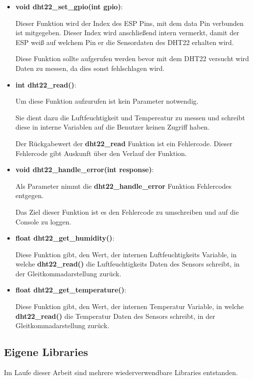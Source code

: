 \begin{itemize}
    \item \textbf{void dht22\_set\_gpio(int gpio)}:

    Dieser Funktion wird der Index des ESP Pins, mit dem data Pin verbunden ist mitgegeben. Dieser Index wird anschließend intern vermerkt, damit der ESP weiß auf welchem Pin er die Sensordaten des DHT22 erhalten wird.
    
    Diese Funktion sollte aufgerufen werden bevor mit dem DHT22 versucht wird Daten zu messen, da dies sonst fehlschlagen wird.
    \item \textbf{int dht22\_read()}:

    Um diese Funktion aufzurufen ist kein Parameter notwendig.

    Sie dient dazu die Luftfeuchtigkeit und Tempereatur zu messen und schreibt diese in interne Variablen auf die Benutzer keinen Zugriff haben.

    Der Rückgabewert der \textbf{dht22\_read} Funktion ist ein Fehlercode. Dieser Fehlercode gibt Auskunft über den Verlauf der Funktion.
    \item \textbf{void dht22\_handle\_error(int response)}:

    Als Parameter nimmt die \textbf{dht22\_handle\_error} Funktion Fehlercodes entgegen.

    Das Ziel dieser Funktion ist es den Fehlercode zu umschreiben und auf die Console zu loggen.
    \item \textbf{float dht22\_get\_humidity()}:

    Diese Funktion gibt, den Wert, der internen Luftfeuchtigkeits Variable, in welche \textbf{dht22\_read()} die Luftfeuchtigkeits Daten des Sensors schreibt, in der Gleitkommadarstellung zurück.
    \item \textbf{float dht22\_get\_temperature()}:

    Diese Funktion gibt, den Wert, der internen Temperatur Variable, in welche \textbf{dht22\_read()} die Temperatur Daten des Sensors schreibt, in der Gleitkommadarstellung zurück.
\end{itemize}

\subsection{Eigene Libraries}\label{sec:own-libraries}

Im Laufe dieser Arbeit sind mehrere wiederverwendbare Libraries entstanden.

